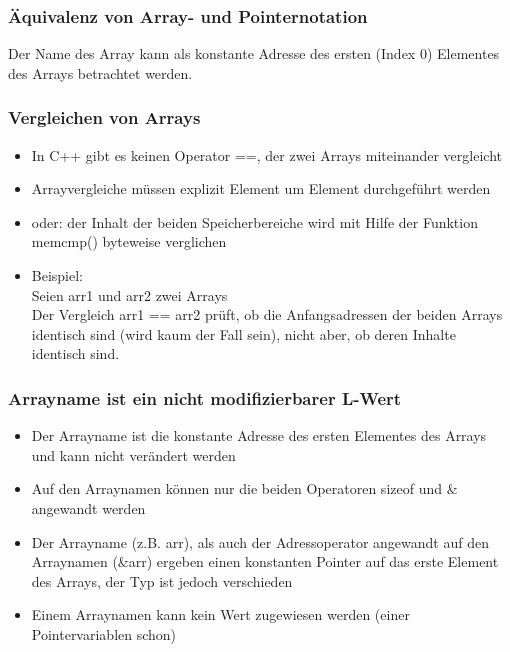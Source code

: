 \subsubsection{Äquivalenz von Array- und Pointernotation}
\label{sec:Aequivalenz von Array- und Pointernotation}
Der Name des Array kann als konstante Adresse des ersten (Index 0) Elementes des Arrays betrachtet werden.\\
\vspace{5mm}
\begin{figure}[h]
	\centering
	
\end{figure}

\subsubsection{Vergleichen von Arrays}
\label{sec:Vergleichen von Arrays}
\begin{itemize}
	\item\color{red}In C++ gibt es keinen Operator ==, der zwei Arrays miteinander vergleicht\color{black}
	\item Arrayvergleiche müssen explizit Element um Element durchgeführt werden
	\item oder: der Inhalt der beiden Speicherbereiche wird mit Hilfe der Funktion memcmp() byteweise verglichen
	\item Beispiel:\\Seien arr1 und arr2 zwei Arrays\\Der Vergleich arr1 == arr2 prüft, ob die Anfangsadressen der beiden Arrays identisch sind (wird kaum der Fall sein), nicht aber, ob deren Inhalte identisch sind.
\end{itemize}
	
\subsubsection{Arrayname ist ein nicht modifizierbarer L-Wert}
\label{sec:Arrayname ist ein nicht modifizierbarer L-Wert}
\begin{itemize}
	\item Der Arrayname ist die konstante Adresse des ersten Elementes des Arrays und kann nicht verändert werden
	\item Auf den Arraynamen können nur die beiden Operatoren sizeof und \& angewandt werden
	\item Der Arrayname (z.B. arr), als auch der Adressoperator angewandt auf den Arraynamen (\&arr) ergeben einen konstanten Pointer auf das erste Element des Arrays, der Typ ist jedoch verschieden
	\item Einem Arraynamen kann kein Wert zugewiesen werden (einer Pointervariablen schon)
\end{itemize}

